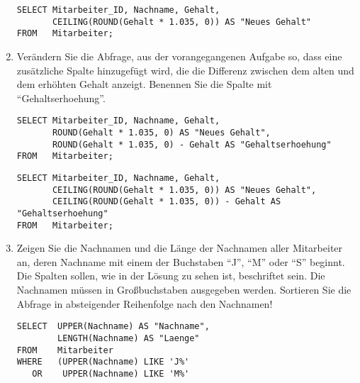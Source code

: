 \begin{enumerate}
\begin{lstlisting}[language=oracle_sql]
        \end{lstlisting}
          \begin{mssql}[\FALSE]
          \end{mssql}
          \begin{lstlisting}[language=ms_sql]
SELECT Mitarbeiter_ID, Nachname, Gehalt,
       CEILING(ROUND(Gehalt * 1.035, 0)) AS "Neues Gehalt"
FROM   Mitarbeiter;
        \end{lstlisting}
    \item Verändern Sie die Abfrage, aus der vorangegangenen Aufgabe so,
          dass eine zusätzliche Spalte hinzugefügt wird, die die Differenz
          zwischen dem alten und dem erhöhten Gehalt anzeigt. Benennen Sie die
          Spalte mit \enquote{Gehaltserhoehung}.
          \begin{oraclesql}[\FALSE]
          \end{oraclesql}
          \begin{lstlisting}[language=oracle_sql]
SELECT Mitarbeiter_ID, Nachname, Gehalt,
       ROUND(Gehalt * 1.035, 0) AS "Neues Gehalt",
       ROUND(Gehalt * 1.035, 0) - Gehalt AS "Gehaltserhoehung"
FROM   Mitarbeiter;
        \end{lstlisting}
          \begin{mssql}[\FALSE]
          \end{mssql}
          \begin{lstlisting}[language=ms_sql]
SELECT Mitarbeiter_ID, Nachname, Gehalt,
       CEILING(ROUND(Gehalt * 1.035, 0)) AS "Neues Gehalt",
       CEILING(ROUND(Gehalt * 1.035, 0)) - Gehalt AS "Gehaltserhoehung"
FROM   Mitarbeiter;
        \end{lstlisting}
    \item Zeigen Sie die Nachnamen und die Länge der Nachnamen aller
          Mitarbeiter an, deren Nachname mit einem der Buchstaben \enquote{J},
          \enquote{M} oder \enquote{S} beginnt. Die Spalten sollen, wie in der
          Lösung zu sehen ist, beschriftet sein. Die Nachnamen müssen in
          Großbuchstaben ausgegeben werden. Sortieren Sie die Abfrage in
          absteigender Reihenfolge nach den Nachnamen!
          \begin{oraclesql}[\FALSE]
          \end{oraclesql}
          \begin{lstlisting}[language=oracle_sql]
SELECT  UPPER(Nachname) AS "Nachname",
        LENGTH(Nachname) AS "Laenge"
FROM    Mitarbeiter
WHERE   (UPPER(Nachname) LIKE 'J%'
   OR    UPPER(Nachname) LIKE 'M%'

\end{lstlisting}
\end{enumerate}
